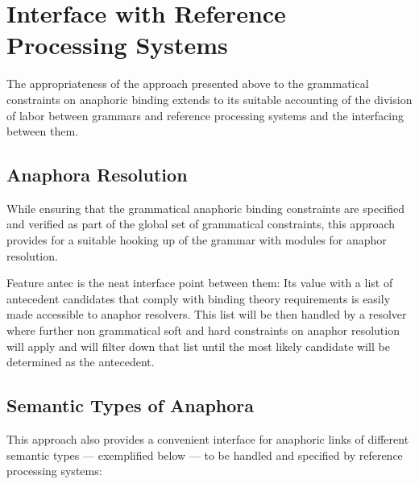\documentclass[output=paper
,modfonts
,nonflat]{langsci/langscibook}
\begin{document}
\section{Interface with Reference Processing Systems \label{discuss}}


The appropriateness of the approach presented above to the grammatical constraints on anaphoric binding
extends to its suitable accounting of the division 
of labor between grammars and reference processing systems and the interfacing between them.

\subsection{Anaphora Resolution \label{resolvers}}

While ensuring that the grammatical anaphoric binding
constraints are specified and verified as part of the global set of grammatical
constraints, this approach provides for a suitable hooking up of the grammar
with modules for anaphor resolution.

Feature {\sc antec} is the neat
interface point between them: Its value with a list of antecedent
candidates that comply with binding theory requirements
is easily made accessible to anaphor resolvers. This list will be then handled by a
resolver where further non grammatical soft and hard constraints
on anaphor resolution will apply and will filter down that list
until the most likely candidate will be determined as the antecedent.

\subsection{Semantic Types of Anaphora\label{semanticTypes}}

This approach also provides a convenient interface for anaphoric links 
of different semantic types ---  exemplified below --- to be handled
and specified by reference processing systems:
\end{document}
